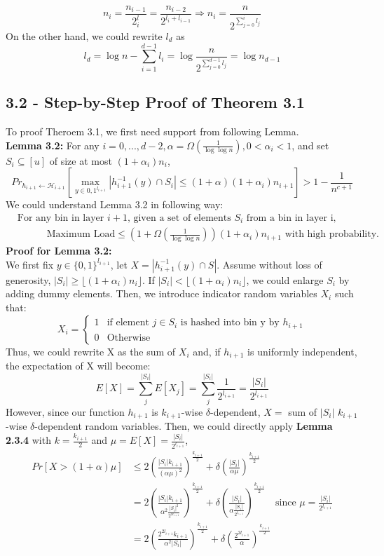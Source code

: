\documentclass[a4paper, english]{paper}
\begin{document}
$$n_i = \frac{n_{i-1}}{2^l_i} = \frac{n_{i-2}}{2^{l_i+l_{i-1}}} \Rightarrow n_i = \frac{n}{2^{\sum_{j=0}^i l_j}}$$
\quad On the other hand, we could rewrite $l_d$ as $$l_d = \log n - \sum_{i=1}^{d-1}l_i = \log\frac{n}{2^{\sum_{j=0}^{d-1} l_j}} =\log n_{d-1}$$

 	\subsection{3.2 - Step-by-Step Proof of Theorem 3.1}
\quad	To proof Theroem 3.1, we first need support from following Lemma.\\
	
	\noindent\textbf{Lemma 3.2:} For any $i = {0,...,d-2},\alpha = \Omega(\frac1{\log\log n}), 0<\alpha_i<1$, and set $S_i\subseteq[u]$ of size at most $(1+\alpha_i)n_i$,
	$${Pr}_{h_{i+1}\leftarrow \mathscr{H}_{i+1}}\left[\max_{y\in{0,1}^{l_{i+1}}}|h_{i+1}^{-1}(y) \cap S_i|\le(1+\alpha)(1+\alpha_i)n_{i+1}\right]> 1-\frac1{n^{c+1}}$$
\quad	We could understand Lemma 3.2 in following way:
	\begin{align*}
	&\text{For any bin in layer $i+1$, given a set of elements $S_i$ from a bin in layer i,}\\
	&\qquad\quad \text{Maximum Load} \le \left(1+\Omega(\frac1 {\log\log n})\right)(1+\alpha_i)n_{i+1} \text{ with high probability.}
	\end{align*}
	\noindent\textbf{Proof for Lemma 3.2:} \\
\quad	We first fix $y\in\{0,1\}^{l_{i+1}}$, let $X=|h_{i+1}^{-1}(y)\cap S|$. Assume without loss of generosity, $|S_i|\ge \lfloor (1+\alpha_i)n_i\rfloor$. If $|S_i|< \lfloor (1+\alpha_i)n_i\rfloor$, we could enlarge $S_i$ by adding dummy elements. Then, we introduce indicator random variables $X_i$ such that:
\[ X_i=\begin{cases} 
      1 & \text{if element }j\in S_i\text{ is hashed into bin y by }h_{i+1} \\
      0 & \text{Otherwise}
   \end{cases}
\]
\quad	Thus, we could rewrite X as the sum of $X_i$ and, if $h_{i+1}$ is uniformly independent, the expectation of X will become:
	$$E[X] = \sum_j^{|S_i|}E[X_j]=\sum_j^{|S_i|}\frac1{2^{l_{i+1}}} = \frac{|S_i|}{2^{l_{i+1}}}$$
\quad	However, since our function $h_{i+1}$ is $k_{i+1}$-wise $\delta$-dependent, $X=$ sum of $|S_i|$ $k_{i+1}$-wise $\delta$-dependent random variables. Then, we could directly apply \textbf{Lemma 2.3.4} with $k = \frac{k_{i+1}}2$ and $\mu =E[X]=\frac{|S_i|}{2^{l_{i+1}}}$,
	\begin{align*}
	Pr[X>(1+\alpha)\mu] &\le 2\left(\frac{|S_i|k_{i+1}}{(\alpha\mu)^2}\right)^{\frac{k_{i+1}}2}+\delta\left( \frac{|S_i|}{\alpha\mu}\right)^{\frac{k_{i+1}}2}\\
	&= 2\left(\frac{|S_i|k_{i+1}}{\alpha^2 \frac{|S_i|^2}{2^{2l_{i+1}}}}\right)^{\frac{k_{i+1}}2} +\delta\left( \frac{|S_i|}{\alpha\frac{|S_i|}{2^{l_{i+1}}}}\right)^{\frac{k_{i+1}}2}\quad\text{since }\mu =\frac{|S_i|}{2^{l_{i+1}}}\\
	&= 2\left(\frac{2^{2l_{i+1}}k_{i+1}}{\alpha^2 |S_i|}\right)^{\frac{k_{i+1}}2} +\delta\left( \frac{2^{2l_{i+1}}}{\alpha}\right)^{\frac{k_{i+1}}2}
	\end{align*}
\end{document}
